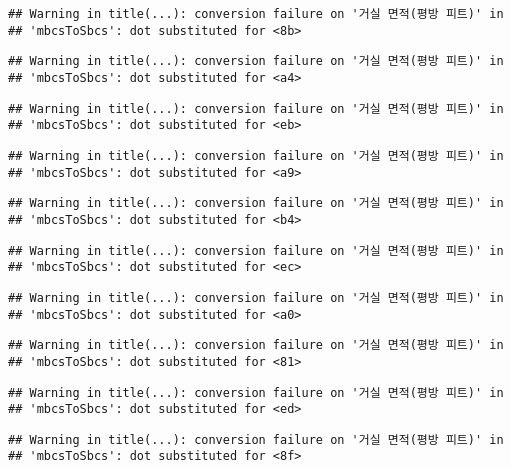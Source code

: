 \documentclass[
]{article}
\begin{document}
\begin{verbatim}
## Warning in title(...): conversion failure on '거실 면적(평방 피트)' in
## 'mbcsToSbcs': dot substituted for <8b>
\end{verbatim}

\begin{verbatim}
## Warning in title(...): conversion failure on '거실 면적(평방 피트)' in
## 'mbcsToSbcs': dot substituted for <a4>
\end{verbatim}

\begin{verbatim}
## Warning in title(...): conversion failure on '거실 면적(평방 피트)' in
## 'mbcsToSbcs': dot substituted for <eb>
\end{verbatim}

\begin{verbatim}
## Warning in title(...): conversion failure on '거실 면적(평방 피트)' in
## 'mbcsToSbcs': dot substituted for <a9>
\end{verbatim}

\begin{verbatim}
## Warning in title(...): conversion failure on '거실 면적(평방 피트)' in
## 'mbcsToSbcs': dot substituted for <b4>
\end{verbatim}

\begin{verbatim}
## Warning in title(...): conversion failure on '거실 면적(평방 피트)' in
## 'mbcsToSbcs': dot substituted for <ec>
\end{verbatim}

\begin{verbatim}
## Warning in title(...): conversion failure on '거실 면적(평방 피트)' in
## 'mbcsToSbcs': dot substituted for <a0>
\end{verbatim}

\begin{verbatim}
## Warning in title(...): conversion failure on '거실 면적(평방 피트)' in
## 'mbcsToSbcs': dot substituted for <81>
\end{verbatim}

\begin{verbatim}
## Warning in title(...): conversion failure on '거실 면적(평방 피트)' in
## 'mbcsToSbcs': dot substituted for <ed>
\end{verbatim}

\begin{verbatim}
## Warning in title(...): conversion failure on '거실 면적(평방 피트)' in
## 'mbcsToSbcs': dot substituted for <8f>
\end{verbatim}
\end{document}
